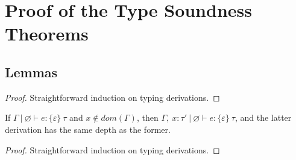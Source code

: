 \section{Proof of the Type Soundness Theorems}
\label{app-effects-type-soundness}

\subsection{Lemmas}


\begin{proof}
Straightforward induction on typing derivations.
\end{proof}


\begin{lemma}[Weakening]
If $\Gamma~|~\varnothing \vdash e : \{ \varepsilon \}~\tau$ and $x \not\in dom(\Gamma)$, then $\Gamma,~x : \tau'~|~\varnothing \vdash e : \{ \varepsilon \}~\tau$, and the latter derivation has the same depth as the former.
\end{lemma}

\begin{proof}
Straightforward induction on typing derivations.
\end{proof}


